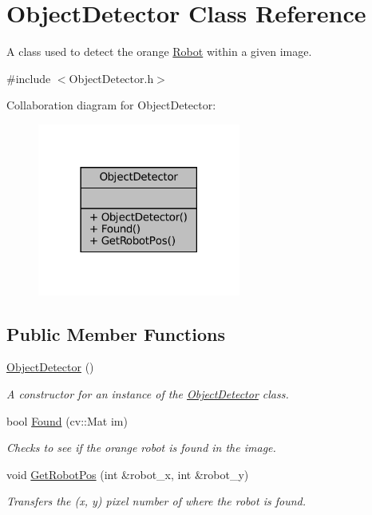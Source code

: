 \hypertarget{classObjectDetector}{}\section{Object\+Detector Class Reference}
\label{classObjectDetector}


A class used to detect the orange \hyperlink{classRobot}{Robot} within a given image.  




{\ttfamily \#include $<$Object\+Detector.\+h$>$}



Collaboration diagram for Object\+Detector\+:\nopagebreak
\begin{figure}[H]
\begin{center}
\leavevmode
\includegraphics[width=189pt]{classObjectDetector__coll__graph}
\end{center}
\end{figure}
\subsection*{Public Member Functions}
\begin{DoxyCompactItemize}
\item 
\mbox{\label{classObjectDetector_a604cad611c81493d4e376b3d1fe186f3}} 
\hyperlink{classObjectDetector_a604cad611c81493d4e376b3d1fe186f3}{Object\+Detector} ()
\begin{DoxyCompactList}\small\item\em A constructor for an instance of the \hyperlink{classObjectDetector}{Object\+Detector} class. \end{DoxyCompactList}\item 
bool \hyperlink{classObjectDetector_a55190dc7b44f92778ef0dc0e7f9fea84}{Found} (cv\+::\+Mat im)
\begin{DoxyCompactList}\small\item\em Checks to see if the orange robot is found in the image. \end{DoxyCompactList}\item 
void \hyperlink{classObjectDetector_a64e8323f779d53b5d957a1b533624440}{Get\+Robot\+Pos} (int \&robot\+\_\+x, int \&robot\+\_\+y)
\begin{DoxyCompactList}\small\item\em Transfers the (x, y) pixel number of where the robot is found. \end{DoxyCompactList}\end{DoxyCompactItemize}


